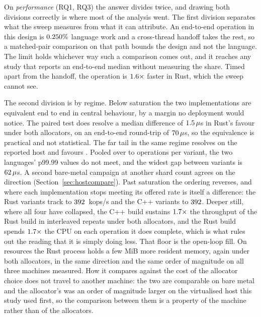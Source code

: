 \documentclass[english,oneside,a4paper,censored,csm,software-track-2020]{HYthesisML}
\begin{document}
On \emph{performance} (RQ1, RQ3) the answer divides twice, and drawing both divisions correctly is
where most of the analysis went. The first division separates what the sweep measures from what it
can attribute. An end-to-end operation in this design is $0.250\%$ language work and
a cross-thread handoff takes the rest, so a matched-pair comparison on that path bounds the design
and not the language. The limit holds whichever way such a comparison comes out, and it reaches
any study that reports an end-to-end median without measuring the share. Timed apart from the
handoff, the operation is $1.6\times$ faster in Rust, which the sweep cannot see.

The second division is by regime. Below saturation the two implementations are equivalent end to
end in central behaviour, by a margin no deployment would notice. The paired test does resolve a
median difference of $1.5\,\mu$s in Rust's favour under both allocators, on an
end-to-end round-trip of $70\,\mu$s, so the equivalence is practical and not statistical.
The far tail in the same regime resolves on the reported host and favours \FarTailLower{}. Pooled
over \FarTailSamplesMin{} to \FarTailSamplesMax{} operations per variant, the two languages' p99.99
values do not meet, and the widest gap between variants is $62\,\mu$s. A second
bare-metal campaign at another shard count agrees on the direction
(Section~\ref{sec:hostcompare}). Past saturation the ordering reverses, and where each
implementation stops meeting its offered rate is itself a difference: the Rust variants track to
$392$~kops/s and the C++ variants to $392$. Deeper still, where all four have
collapsed, the C++ build sustains $1.7\times$ the throughput of the Rust
build in \OverloadThrAgree{} interleaved repeats under both allocators, and the Rust build spends
$1.7\times$ the CPU on each operation it does complete, which is what rules out
the reading that it is simply doing less. That floor is the open-loop fill. On resources the Rust process holds a few MiB more resident memory, again
under both allocators, in the same direction and the same order of magnitude on all three machines
measured. How it compares against the cost of the allocator choice does not travel to another
machine: the two are comparable on bare metal and the allocator's was an order of magnitude
larger on the virtualised
host this study used first, so the comparison between them is a property of the machine rather
than of the allocators.
\end{document}
